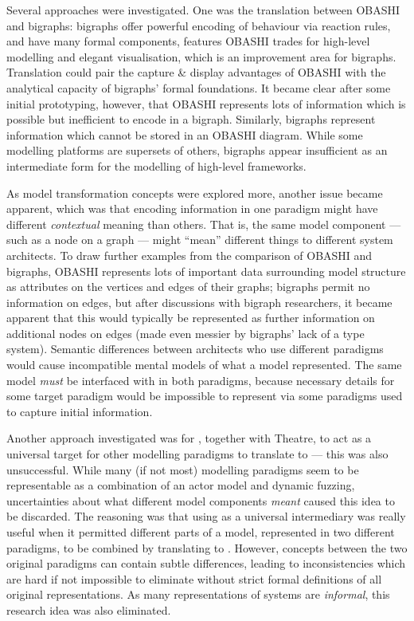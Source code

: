 \documentclass[draft]{article}
\begin{document}
Several approaches were investigated. One was the translation between OBASHI and
bigraphs: bigraphs offer powerful encoding of behaviour via reaction rules, and
have many formal components, features OBASHI trades for high-level modelling and
elegant visualisation, which is an improvement area for bigraphs. Translation
could pair the capture \& display advantages of OBASHI with the analytical
capacity of bigraphs' formal foundations. It became clear after some initial
prototyping, however, that OBASHI represents lots of information which is
possible but inefficient to encode in a bigraph. Similarly, bigraphs represent
information which cannot be stored in an OBASHI diagram. While some modelling
platforms are supersets of others, bigraphs appear insufficient as an
intermediate form for the modelling of high-level frameworks.\par

As model transformation concepts were explored more, another issue became
apparent, which was that encoding information in one paradigm might have
different \emph{contextual} meaning than others. That is, the same model
component --- such as a node on a graph --- might ``mean'' different things to
different system architects. To draw further examples from the comparison of
OBASHI and bigraphs, OBASHI represents lots of important data surrounding model
structure as attributes on the vertices and edges of their graphs; bigraphs
permit no information on edges, but after discussions with bigraph researchers,
it became apparent that this would typically be represented as further
information on additional nodes on edges (made even messier by bigraphs' lack of
a type system). Semantic differences between architects who use different
paradigms would cause incompatible mental models of what a model represented.
The same model \emph{must} be interfaced with in both paradigms, because
necessary details for some target paradigm would be impossible to represent via
some paradigms used to capture initial information.\par

Another approach investigated was for \pdsf{}, together with Theatre, to act as
a universal target for other modelling paradigms to translate to --- this was
also unsuccessful. While many (if not most) modelling paradigms seem to be
representable as a combination of an actor model and dynamic fuzzing,
uncertainties about what different model components \emph{meant} caused this
idea to be discarded. The reasoning was that using \pdsf{} as a universal
intermediary was really useful when it permitted different parts of a model,
represented in two different paradigms, to be combined by translating to
\pdsf{}. However, concepts between the two original paradigms can contain subtle
differences, leading to inconsistencies which are hard if not impossible to
eliminate without strict formal definitions of all original representations. As
many representations of systems are \emph{informal}, this research idea was also
eliminated.\par
\end{document}
